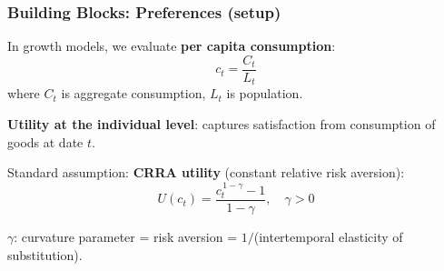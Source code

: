 \documentclass[xcolor=x11names,compress,aspectratio=169]{beamer}%
\makeatletter
\renewenvironment{itemize}{\begin{compactitemize}[<+-| alert@+>]}{\end{compactitemize}}
\makeatother
\begin{document}
\begin{frame}%
%

\frametitle{Building Blocks: Preferences (setup)}%


\begin{itemize}
\item In growth models, we evaluate \textbf{per capita consumption}:
\[
c_{t} = \frac{C_{t}}{L_{t}}
\]
where $C_{t}$ is aggregate consumption, $L_{t}$ is population. \vspace{0.3cm}

\item \textbf{Utility at the individual level}: captures satisfaction from
consumption of goods at date $t$. \vspace{0.3cm}

\item Standard assumption: \textbf{CRRA utility} (constant relative risk
aversion):
\[
U(c_{t}) = \frac{c_{t}^{\,1-\gamma} - 1}{1-\gamma}, \quad\gamma> 0
\]


\begin{itemize}
\item $\gamma$: curvature parameter = risk aversion = $1/$(intertemporal
elasticity of substitution).
\end{itemize}
\end{itemize}

%

\transboxout
\end{frame}%
%
\end{document}
